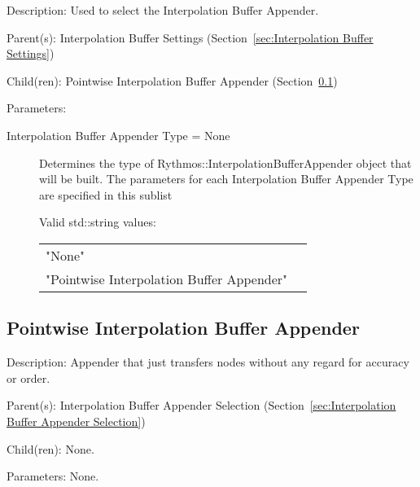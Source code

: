 \begin{list}{}
  {\setlength{\leftmargin}{1.0in}
   \setlength{\labelwidth}{0.75in}
   \setlength{\labelsep}{0.125in}}
  \item[Description:]
    Used to select the Interpolation Buffer Appender.
  \item[Parent(s):]
    Interpolation Buffer Settings (Section~\ref{sec:Interpolation Buffer Settings})
  \item[Child(ren):]
    Pointwise Interpolation Buffer Appender (Section~\ref{sec:Pointwise Interpolation Buffer Appender})
  \item[Parameters:]
    \begin{description}
      \item[Interpolation Buffer Appender Type = None] 
Determines the type of Rythmos::InterpolationBufferAppender object that will be built.
The parameters for each Interpolation Buffer Appender Type are specified in this sublist

  Valid std::string values:

      \begin{tabular}{lp{}}
      "None" & \\ 
      "Pointwise Interpolation Buffer Appender" & \\ 
      \end{tabular}
\end{description}

\end{list}

\subsection{Pointwise Interpolation Buffer Appender}
\label{sec:Pointwise Interpolation Buffer Appender}

\begin{list}{}
  {\setlength{\leftmargin}{1.0in}
   \setlength{\labelwidth}{0.75in}
   \setlength{\labelsep}{0.125in}}
  \item[Description:]
    Appender that just transfers nodes without any regard for accuracy or order.
  \item[Parent(s):]
    Interpolation Buffer Appender Selection (Section~\ref{sec:Interpolation Buffer Appender Selection})
  \item[Child(ren):]
    None. 
  \item[Parameters:]
    None. 
\end{list}

